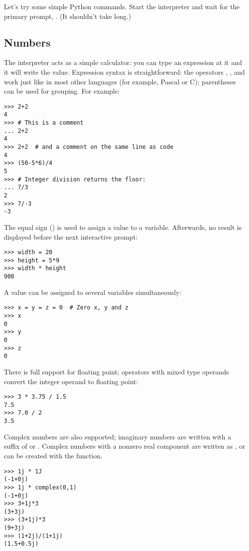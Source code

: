 \documentclass{manual}
\begin{document}
Let's try some simple Python commands.  Start the interpreter and wait
for the primary prompt, \samp{>\code{>}>~}.  (It shouldn't take long.)

\subsection{Numbers \label{numbers}}

The interpreter acts as a simple calculator: you can type an
expression at it and it will write the value.  Expression syntax is
straightforward: the operators \code{+}, \code{-}, \code{*} and
\code{/} work just like in most other languages (for example, Pascal
or C); parentheses can be used for grouping.  For example:

\begin{verbatim}
>>> 2+2
4
>>> # This is a comment
... 2+2
4
>>> 2+2  # and a comment on the same line as code
4
>>> (50-5*6)/4
5
>>> # Integer division returns the floor:
... 7/3
2
>>> 7/-3
-3
\end{verbatim}

The equal sign (\character{=}) is used to assign a value to a variable.
Afterwards, no result is displayed before the next interactive prompt:

\begin{verbatim}
>>> width = 20
>>> height = 5*9
>>> width * height
900
\end{verbatim}

A value can be assigned to several variables simultaneously:

\begin{verbatim}
>>> x = y = z = 0  # Zero x, y and z
>>> x
0
>>> y
0
>>> z
0
\end{verbatim}

There is full support for floating point; operators with mixed type
operands convert the integer operand to floating point:

\begin{verbatim}
>>> 3 * 3.75 / 1.5
7.5
>>> 7.0 / 2
3.5
\end{verbatim}

Complex numbers are also supported; imaginary numbers are written with
a suffix of  or .  Complex numbers with a nonzero
real component are written as , or can
be created with the  function.

\begin{verbatim}
>>> 1j * 1J
(-1+0j)
>>> 1j * complex(0,1)
(-1+0j)
>>> 3+1j*3
(3+3j)
>>> (3+1j)*3
(9+3j)
>>> (1+2j)/(1+1j)
(1.5+0.5j)
\end{verbatim}
\end{document}
